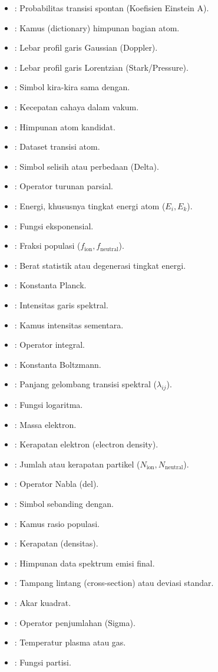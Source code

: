 \singkatan
\begin{itemize}[itemsep=0pt, parsep=0pt]
    \item[$A_{ki}$] : Probabilitas transisi spontan (Koefisien Einstein A).
    \item[$\mathcal{A}$] : Kamus (dictionary) himpunan bagian atom.
    \item[$\alpha_G$] : Lebar profil garis Gaussian (Doppler).
    \item[$\alpha_L$] : Lebar profil garis Lorentzian (Stark/Pressure).
    \item[$\approx$] : Simbol kira-kira sama dengan.
    \item[$c$] : Kecepatan cahaya dalam vakum.
    \item[$\mathcal{C}$] : Himpunan atom kandidat.
    \item[$\mathcal{D}$] : Dataset transisi atom.
    \item[$\Delta$] : Simbol selisih atau perbedaan (Delta).
    \item[$\partial$] : Operator turunan parsial.
    \item[$E$] : Energi, khususnya tingkat energi atom ($E_i, E_k$).
    \item[$\exp()$] : Fungsi eksponensial.
    \item[$f$] : Fraksi populasi ($f_{\text{ion}}, f_{\text{neutral}}$).
    \item[$g$] : Berat statistik atau degenerasi tingkat energi.
    \item[$h$] : Konstanta Planck.
    \item[$I$] : Intensitas garis spektral.
    \item[$\mathcal{I}$] : Kamus intensitas sementara.
    \item[$\int$] : Operator integral.
    \item[$k_B$] : Konstanta Boltzmann.
    \item[$\lambda$] : Panjang gelombang transisi spektral ($\lambda_{ij}$).
    \item[$\log()$] : Fungsi logaritma.
    \item[$m_e$] : Massa elektron.
    \item[$n_e$] : Kerapatan elektron (electron density).
    \item[$N$] : Jumlah atau kerapatan partikel ($N_{\text{ion}}, N_{\text{neutral}}$).
    \item[$\nabla$] : Operator Nabla (del).
    \item[$\propto$] : Simbol sebanding dengan.
    \item[$\mathcal{R}$] : Kamus rasio populasi.
    \item[$\rho$] : Kerapatan (densitas).
    \item[$\mathcal{S}$] : Himpunan data spektrum emisi final.
    \item[$\sigma$] : Tampang lintang (cross-section) atau deviasi standar.
    \item[$\sqrt{}$] : Akar kuadrat.
    \item[$\sum$] : Operator penjumlahan (Sigma).
    \item[$T$] : Temperatur plasma atau gas.
    \item[$Z$] : Fungsi partisi.
\end{itemize}

